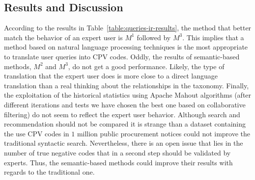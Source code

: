 \subsection{Results and Discussion}
According to the results in Table~\ref{table:queries-ir-results}, the method that better match the behavior of an expert user is $M^1$ followed by $M^3$. 
This implies that a method based on natural language processing techniques is the most appropriate to translate user queries into CPV codes. 
Oddly, the results of semantic-based methods, $M^2$ and $M^3$, do not get a good performance. Likely, the type of translation 
that the expert user does is more close to a direct language translation than a real thinking about the 
relationships in the taxonomy. Finally, the exploitation of the historical statistics using Apache Mahout algorithms 
(after different iterations and tests we have chosen the best one based on collaborative filtering) do not seem to reflect 
the expert user behavior. Although search and recommendation should not be compared it is strange than a dataset containing the use 
CPV codes in $1$ million public procurement notices could not improve the traditional syntactic search. Nevertheless, there is an 
open issue that lies in the number of true negative codes that in a second step should be validated by experts. 
Thus, the semantic-based methods could improve their results with regards to the traditional one. 



